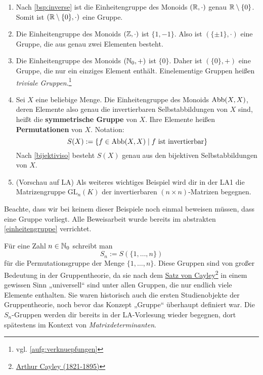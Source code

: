 \begin{bsp}   \quad
    \begin{enumerate}
        \item Nach \cref{bsp:inverse} ist die Einheitengruppe des Monoids $(\mathbb R,\cdot)$ genau $\mathbb R\setminus \{0\}$. Somit ist $(\mathbb R\setminus \{0\},\cdot)$ eine Gruppe.
        \item Die Einheitengruppe des Monoids $(\mathbb Z,\cdot)$ ist $\{1,-1\}$. Also ist $(\{\pm 1\},\cdot)$ eine Gruppe, die aus genau zwei Elementen besteht.
        \item Die Einheitengruppe des Monoids $(\mathbb N_0,+)$ ist $\{0\}$. Daher ist $(\{0\},+)$ eine Gruppe, die nur ein einziges Element enthält. Einelementige Gruppen heißen \emph{triviale Gruppen}.\footnote{vgl. \cref{aufg:verknuepfungen}}
        \item Sei $X$ eine beliebige Menge. Die Einheitengruppe des Monoids $\operatorname{Abb}(X,X)$, deren Elemente also genau die invertierbaren Selbstabbildungen von $X$ sind, heißt die \textbf{symmetrische Gruppe} von $X$. Ihre Elemente heißen \textbf{Permutationen} von $X$. Notation:
            \[ S(X) := \{f\in \Abb(X,X)\mid f\ \text{ist invertierbar} \} \]
        Nach \cref{bijektiviso} besteht $S(X)$ genau aus den bijektiven Selbstabbildungen von $X$.
        \item(Vorschau auf LA) Als weiteres wichtiges Beispiel wird dir in der LA1 die Matrizengruppe $\mathrm{GL}_n(K)$ der invertierbaren $(n\times n)$-Matrizen begegnen.
    \end{enumerate}
    Beachte, dass wir bei keinem dieser Beispiele noch einmal beweisen müssen, dass eine Gruppe vorliegt. Alle Beweisarbeit wurde bereits im abstrakten \cref{einheitengruppe} verrichtet.
\end{bsp}


\begin{bem}
    Für eine Zahl $n\in \mathbb N_0$ schreibt man
        \[ S_n := S(\{1,\dots , n\}) \]
    für die Permutationsgruppe der Menge $\{1,\dots , n\}$. Diese Gruppen sind von großer Bedeutung in der Gruppentheorie, da sie nach dem \href{https://de.wikipedia.org/wiki/Satz_von_Cayley}{Satz von Cayley}\footnote{\href{https://de.wikipedia.org/wiki/Arthur_Cayley}{Arthur Cayley (1821-1895)}} in einem gewissen Sinn „universell“ sind unter allen Gruppen, die nur endlich viele Elemente enthalten. Sie waren historisch auch die ersten Studienobjekte der Gruppentheorie, noch bevor das Konzept „Gruppe“ überhaupt definiert war. Die $S_n$-Gruppen werden dir bereits in der LA-Vorlesung wieder begegnen, dort spätestens im Kontext von \emph{Matrixdeterminanten}.
\end{bem}


